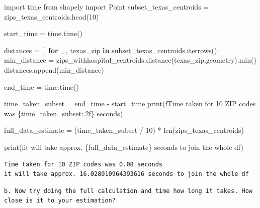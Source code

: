 \documentclass[
  letterpaper,
  DIV=11,
  numbers=noendperiod]{scrartcl}
\newenvironment{Shaded}{\begin{snugshade}}{\end{snugshade}}
\newcommand{\BuiltInTok}[1]{\textcolor[rgb]{0.00,0.23,0.31}{#1}}
\newcommand{\ControlFlowTok}[1]{\textcolor[rgb]{0.00,0.23,0.31}{\textbf{#1}}}
\newcommand{\DecValTok}[1]{\textcolor[rgb]{0.68,0.00,0.00}{#1}}
\newcommand{\ImportTok}[1]{\textcolor[rgb]{0.00,0.46,0.62}{#1}}
\newcommand{\KeywordTok}[1]{\textcolor[rgb]{0.00,0.23,0.31}{\textbf{#1}}}
\newcommand{\NormalTok}[1]{\textcolor[rgb]{0.00,0.23,0.31}{#1}}
\newcommand{\OperatorTok}[1]{\textcolor[rgb]{0.37,0.37,0.37}{#1}}
\newcommand{\SpecialCharTok}[1]{\textcolor[rgb]{0.37,0.37,0.37}{#1}}
\newcommand{\SpecialStringTok}[1]{\textcolor[rgb]{0.13,0.47,0.30}{#1}}
\begin{document}
\begin{Shaded}
\begin{Highlighting}[]
\ImportTok{import}\NormalTok{ time}
\ImportTok{from}\NormalTok{ shapely }\ImportTok{import}\NormalTok{ Point}
\NormalTok{subset\_texas\_centroids }\OperatorTok{=}\NormalTok{ zips\_texas\_centroids.head(}\DecValTok{10}\NormalTok{)}

\NormalTok{start\_time }\OperatorTok{=}\NormalTok{ time.time()}

\NormalTok{distances }\OperatorTok{=}\NormalTok{ []}
\ControlFlowTok{for}\NormalTok{ \_, texas\_zip }\KeywordTok{in}\NormalTok{ subset\_texas\_centroids.iterrows():}
\NormalTok{    min\_distance }\OperatorTok{=}\NormalTok{ zips\_withhospital\_centroids.distance(texas\_zip.geometry).}\BuiltInTok{min}\NormalTok{()}
\NormalTok{    distances.append(min\_distance)}


\NormalTok{end\_time }\OperatorTok{=}\NormalTok{ time.time()}

\NormalTok{time\_taken\_subset }\OperatorTok{=}\NormalTok{ end\_time }\OperatorTok{{-}}\NormalTok{ start\_time}
\BuiltInTok{print}\NormalTok{(}\SpecialStringTok{f\textquotesingle{}Time taken for 10 ZIP codes was }\SpecialCharTok{\{}\NormalTok{time\_taken\_subset}\SpecialCharTok{:.2f\}}\SpecialStringTok{ seconds\textquotesingle{}}\NormalTok{)}

\NormalTok{full\_data\_estimate }\OperatorTok{=}\NormalTok{ (time\_taken\_subset }\OperatorTok{/} \DecValTok{10}\NormalTok{) }\OperatorTok{*} \BuiltInTok{len}\NormalTok{(zips\_texas\_centroids)}

\BuiltInTok{print}\NormalTok{(}\SpecialStringTok{f\textquotesingle{}it will take approx. }\SpecialCharTok{\{}\NormalTok{full\_data\_estimate}\SpecialCharTok{\}}\SpecialStringTok{ seconds to join the whole df\textquotesingle{}}\NormalTok{)}
\end{Highlighting}
\end{Shaded}

\begin{verbatim}
Time taken for 10 ZIP codes was 0.08 seconds
it will take approx. 16.028010964393616 seconds to join the whole df
\end{verbatim}

\begin{verbatim}
b. Now try doing the full calculation and time how long it takes. How close is it to your estimation?
\end{verbatim}
\end{document}
